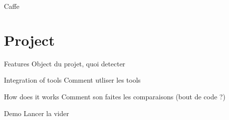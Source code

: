 \documentclass{beamer}
\begin{document}
\begin{frame}{Caffe}
    \begin{itemize}
        \item CAFFE: Convolutional Architecture for Fast Feature Embedding  \\
            \hspace{0.27cm}\textit}


    \end{itemize}
\end{frame}

\section{Project}
\begin{frame}{Features}
    Object du projet, quoi detecter
\end{frame}
\begin{frame}{Integration of tools}
    Comment utliser les tools
\end{frame}
\begin{frame}{How does it works}
    Comment son faites les comparaisons (bout de code ?)
\end{frame}
\begin{frame}{Demo}
    Lancer la vider
\end{frame}
\end{document}
